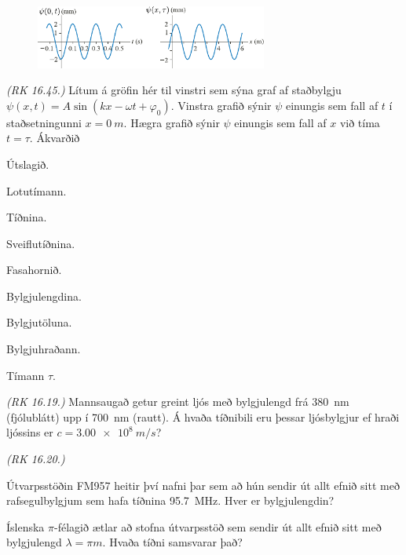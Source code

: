 \ifdefined \wholebook \else\documentclass[oneside]{book}\usepackage{EdlBook}\graphicspath{{figures/}}
\begin{document}
\begin{enumerate}[label = \textbf{Dæmi \thechapter.\arabic*.}]
\begin{minipage}{\linewidth}

\begin{figure}
\vspace{-0.5cm}
\includegraphics[width = 3in]{figures/both-at-the-same-time2.pdf}
\end{figure}

\item \textit{(RK 16.45.)} Lítum á gröfin hér til vinstri sem sýna graf af staðbylgju $\psi(x,t) = A\sin(kx-\omega t + \varphi_0)$. Vinstra grafið sýnir $\psi$ einungis sem fall af $t$ í staðsetningunni $x = \SI{0}{m}$. Hægra grafið sýnir $\psi$ einungis sem fall af $x$ við tíma $t = \tau$. Ákvarðið
\begin{enumerate*}[label = \textbf{(\alph*)}]
    \item Útslagið.
    \item Lotutímann.
    \item Tíðnina.
    \item Sveiflutíðnina.
    \item Fasahornið.
    \item Bylgjulengdina.
    \item Bylgjutöluna.
    \item Bylgjuhraðann.
    \item Tímann $\tau$.
\end{enumerate*}
\end{minipage}

\item \textit{(RK 16.19.)} Mannsaugað getur greint ljós með bylgjulengd frá \SI{380}{nm} (fjólublátt) upp í \SI{700}{nm} (rautt). Á hvaða tíðnibili eru þessar ljósbylgjur ef hraði ljóssins er $c = \SI{3.00e8}{m/s}$? 

\item \textit{(RK 16.20.)} \begin{enumerate*}[label = \textbf{(\alph*)}] \item Útvarpsstöðin FM957 heitir því nafni þar sem að hún sendir út allt efnið sitt með rafsegulbylgjum sem hafa tíðnina \SI{95.7}{MHz}. Hver er bylgjulengdin? \item Íslenska $\pi$-félagið ætlar að stofna útvarpsstöð sem sendir út allt efnið sitt með bylgjulengd $\lambda = \pi \si{m}$. Hvaða tíðni samsvarar það?
\end{enumerate*}
\end{enumerate}
\end{document}
